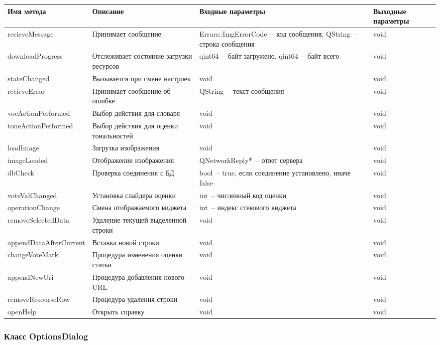 \documentclass[a4paper,14pt,russian]{extreport}
\begin{document}
\begin{longtable}{|m{3 cm}|m{3 cm}|m{4 cm}|m{4 cm}|}
\hline
Имя метода & Описание & Входные параметры & Выходные параметры \\
\hline
{recieve\-Message} & Принимает сообщение & {Errors::Img\-Error\-Code}~-- код сообщения, QString~-- строка сообщения & void \\
\hline
{download\-Progress} & Отслеживает состояние загрузки ресурсов & qint64~-- байт загружено, qint64~-- байт всего & void \\
\hline
{state\-Changed} & Вызывается при смене настроек & void & void \\
\hline
{recieve\-Error} & Принимает сообщение об ошибке & QString~-- текст сообщения & void \\
\hline
{voc\-Action\-Performed} & Выбор действия для словаря & void & void \\
\hline
{tone\-Action\-Performed} & Выбор действия для оценки тональностей & void & void \\
\hline
{load\-Image} & Загрузка изображения & void & void \\
\hline
{image\-Loaded} & Отображение изображения & {QNetwork\-Reply*}~-- ответ сервера & void \\
\hline
dbCheck & Проверка соединения с БД & bool~-- true, если соединение установлено, иначе false & void \\
\hline
{vote\-Val\-Changed} & Установка слайдера оценки & int~-- численный код оценки & void \\
\hline
{operation\-Change} & Смена отображаемого виджета & int~-- индекс стекового виджета & void \\
\hline
{remove\-Selected\-Data} & Удаление текущей выделенной строки & void & void \\
\hline
{append\-Data\-After\-Current} & Вставка новой строки & void & void \\
\hline
{change\-Vote\-Mark} & Процедура изменения оценки статьи & void & void \\
\hline
{append\-New\-Uri} & Процедура добавления нового URL & void & void \\
\hline
{remove\-Resourse\-Row} & Процедура удаления строки & void & void \\
\hline
{open\-Help} & Открыть справку & void & void \\
\hline
\end{longtable}

\newpage

\subsubsection{Класс OptionsDialog}
\end{document}
